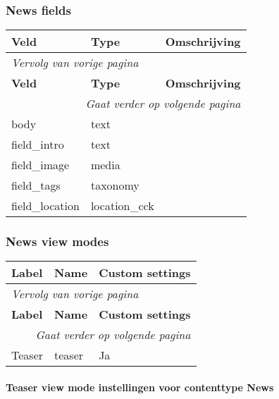 \subsubsection{News fields}
  \begin{longtable}{| p{5.00cm}|p{5.00cm}|p{5.00cm}|}
  \hline
  \rowcolor{tableheader}
  \textbf{Veld} & \textbf{Type} & \textbf{Omschrijving}  \tabularnewline
  \hline
\endfirsthead
\multicolumn{3}{l}{\textit{Vervolg van vorige pagina}} \\
\hline
\rowcolor{tableheader}
  \textbf{Veld} & \textbf{Type} & \textbf{Omschrijving}  \tabularnewline
  \hline
\hline
\endhead
\multicolumn{3}{r}{\textit{Gaat verder op volgende pagina}} \\
\endfoot
\hline
\endlastfoot
  body & text &   \tabularnewline
  \hline
  field\_intro & text &   \tabularnewline
  \hline
  field\_image & media &   \tabularnewline
  \hline
  field\_tags & taxonomy &   \tabularnewline
  \hline
  field\_location & location\_cck &   \tabularnewline
  \hline
  \end{longtable}

\subsubsection{News view modes}
  \begin{longtable}{| p{5.00cm}|p{5.00cm}|p{5.00cm}|}
  \hline
  \rowcolor{tableheader}
  \textbf{Label} & \textbf{Name} & \textbf{Custom settings}  \tabularnewline
  \hline
\endfirsthead
\multicolumn{3}{l}{\textit{Vervolg van vorige pagina}} \\
\hline
\rowcolor{tableheader}
  \textbf{Label} & \textbf{Name} & \textbf{Custom settings}  \tabularnewline
  \hline
\hline
\endhead
\multicolumn{3}{r}{\textit{Gaat verder op volgende pagina}} \\
\endfoot
\hline
\endlastfoot
  Teaser & teaser & Ja  \tabularnewline
  \hline
  \end{longtable}

\paragraph{Teaser view mode instellingen voor contenttype News }

